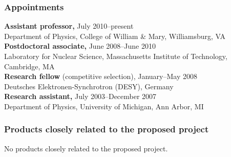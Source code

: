 \documentclass[11pt,letterpaper]{article}
\begin{document}

\subsubsection*{Appointments}

\textbf{Assistant professor,} July 2010--present \\
Department of Physics, College of William \& Mary, Williamsburg, VA \\
%
\textbf{Postdoctoral associate,} June 2008--June 2010 \\
Laboratory for Nuclear Science, Massachusetts Institute of Technology, Cambridge, MA \\
%
\textbf{Research fellow} (competitive selection), January--May 2008 \\
Deutsches Elektronen-Synchrotron (DESY), Germany \\
%
\textbf{Research assistant,} July 2003--December 2007 \\
Department of Physics, University of Michigan, Ann Arbor, MI


\subsubsection*{Products closely related to the proposed project}

No products closely related to the proposed project.

\end{document}
